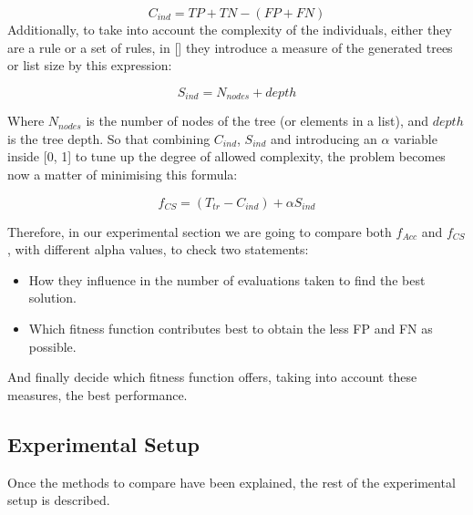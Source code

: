 \begin{equation}
\label{eq:coverage}
C_{ind} = TP + TN - (FP + FN)
\end{equation}
Additionally, to take into account the complexity of the individuals,
either they are a rule or a set of rules, in [\cite{witten2005data}]
they introduce a measure of the generated trees or list size by this
expression: 

\begin{equation}
S_{ind} = N_{nodes} + depth
\end{equation}

Where $N_{nodes}$ is the number of nodes of the tree (or elements in a list), and $depth$ is the tree depth. So that combining $C_{ind}$, $S_{ind}$ and introducing an $\alpha$ variable inside [0, 1] to tune up the degree of allowed complexity, the problem becomes now a matter of minimising this formula:

\begin{equation}
\label{eq:complexFitness}
f_{CS} = (T_{tr} - C_{ind}) + \alpha S_{ind}
\end{equation}

Therefore, in our experimental section we are going to compare both
$f_{Acc}$ and $f_{CS}$, with different  alpha values, to check two statements:

\begin{itemize}
	\item How they influence in the number of evaluations taken to find the best solution.
	\item Which fitness function contributes best to obtain the less FP and FN as possible.
\end{itemize}

And finally decide which fitness function offers, taking into account these measures, the best performance. 



\subsection{Experimental Setup}
\label{sec:experiments}

Once the methods to compare have been explained, the rest of the experimental setup is described.

